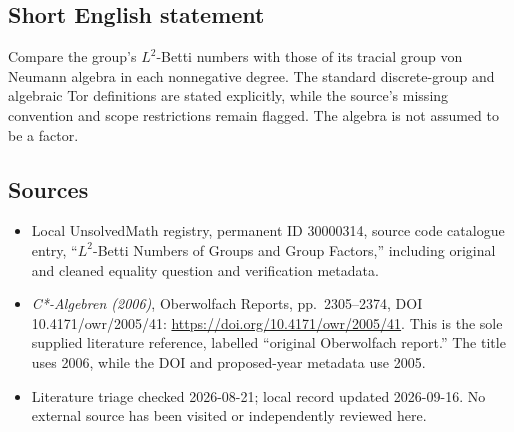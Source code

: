 \documentclass[11pt]{article}
\begin{document}
\subsection{Short English statement}
Compare the group's \(L^2\)-Betti numbers with those of its tracial group von Neumann algebra in each nonnegative degree. The standard discrete-group and algebraic Tor definitions are stated explicitly, while the source's missing convention and scope restrictions remain flagged. The algebra is not assumed to be a factor.
\subsection{Sources}
\begin{itemize}
\item Local UnsolvedMath registry, permanent ID 30000314, source code catalogue entry, ``\(L^2\)-Betti Numbers of Groups and Group Factors,'' including original and cleaned equality question and verification metadata.
\item \emph{C*-Algebren (2006)}, Oberwolfach Reports, pp.\ 2305--2374, DOI 10.4171/owr/2005/41: \url{https://doi.org/10.4171/owr/2005/41}. This is the sole supplied literature reference, labelled ``original Oberwolfach report.'' The title uses 2006, while the DOI and proposed-year metadata use 2005.
\item Literature triage checked 2026-08-21; local record updated 2026-09-16. No external source has been visited or independently reviewed here.
\end{itemize}
\end{document}
